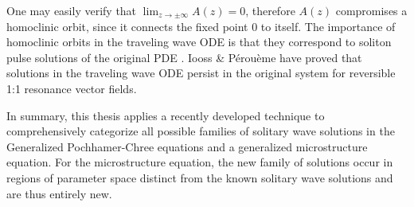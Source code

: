 One may easily verify that $\lim_{z\rightarrow\pm\infty} A(z) = 0$, therefore
$A(z)$ compromises a homoclinic orbit, since it connects the fixed point $0$ to
itself. The importance of homoclinic orbits in the traveling wave ODE is that
they correspond to soliton pulse solutions of the original PDE \cite{IA}. Iooss
\& P\'erou\`eme have proved that solutions in the traveling wave ODE persist in
the original system \cite{IP} for reversible 1:1 resonance vector fields. 

In summary, this thesis applies a recently developed technique to
comprehensively categorize all possible families of solitary wave solutions in
the Generalized Pochhamer-Chree equations and a generalized microstructure
equation.  For the microstructure equation, the new family of solutions occur in
regions of parameter space distinct from the known solitary wave solutions and
are thus entirely new. 

